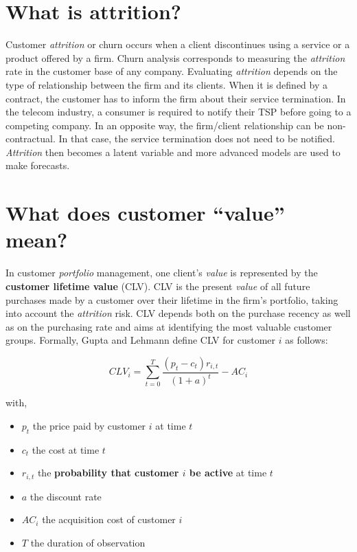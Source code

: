 \documentclass[
]{book}
\providecommand{\tightlist}{%
  \setlength{\itemsep}{0pt}\setlength{\parskip}{0pt}}
\begin{document}
\hypertarget{attritiondef}{%
\section{What is attrition?}\label{attritiondef}}

Customer \emph{attrition} or churn occurs when a client discontinues using a service or a product offered by a firm. Churn analysis corresponds to measuring the \emph{attrition} rate in the customer base of any company. Evaluating \emph{attrition} depends on the type of relationship between the firm and its clients. When it is defined by a contract, the customer has to inform the firm about their service termination. In the telecom industry, a consumer is required to notify their TSP before going to a competing company. In an opposite way, the firm/client relationship can be non-contractual. In that case, the service termination does not need to be notified. \emph{Attrition} then becomes a latent variable and more advanced models are used to make forecasts.

\hypertarget{valuedef}{%
\section{What does customer ``value'' mean?}\label{valuedef}}

In customer \emph{portfolio} management, one client's \emph{value} is represented by the \textbf{customer lifetime value} (CLV). CLV is the present \emph{value} of all future purchases made by a customer over their lifetime in the firm's portfolio, taking into account the \emph{attrition} risk. CLV depends both on the purchase recency as well as on the purchasing rate and aims at identifying the most valuable customer groups. Formally, Gupta and Lehmann \citep{CUSTOMERS_ASSETS} define CLV for customer \(i\) as follows:

\begin{equation}
  CLV_i = \sum_{t=0}^{T} \frac{(p_t - c_t)r_{i,t}}{(1+a)^t} - AC_i
  \label{eq:clv}
\end{equation}

with,

\begin{itemize}
\tightlist
\item
  \(p_t\) the price paid by customer \(i\) at time \(t\)
\item
  \(c_t\) the cost at time \(t\)
\item
  \(r_{i,t}\) the \textbf{probability that customer \(i\) be active} at time \(t\)
\item
  \(a\) the discount rate
\item
  \(AC_i\) the acquisition cost of customer \(i\)
\item
  \(T\) the duration of observation
\end{itemize}
\end{document}
